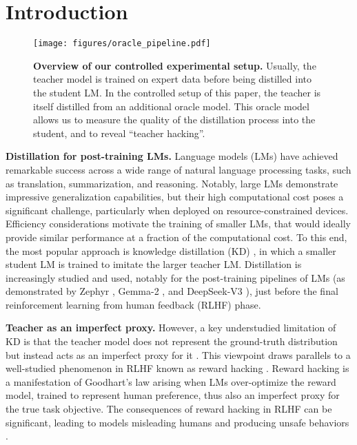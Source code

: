 \section{Introduction}\label{sec:intro}

\begin{figure}
    \centering
    \texttt{[image: figures/oracle\_pipeline.pdf]}
    \caption{\textbf{Overview of our controlled experimental setup.} Usually, the teacher model is trained on expert data before being distilled into the student LM. In the controlled setup of this paper, the teacher is  itself distilled from an additional oracle model. This oracle model allows us to measure the quality of the distillation process into the student, and to reveal \enquote{teacher hacking}.}
    \label{fig:oracle_pipeline}
\end{figure}



\textbf{Distillation for post-training LMs.}
Language models (LMs) have achieved remarkable success across a wide range of natural language processing tasks, such as translation, summarization, and reasoning.
Notably, large LMs demonstrate impressive generalization capabilities, but their high computational cost poses a significant challenge, particularly when deployed on resource-constrained devices. Efficiency considerations motivate the training of smaller LMs, that would ideally provide similar performance at a fraction of the computational cost. To this end, the most popular approach is knowledge distillation (KD) \cite{hinton2015distilling}, in which a smaller student LM is trained to imitate the larger teacher LM.
Distillation is increasingly studied \cite{agarwal2024onpolicy,gu2024minillm,kim2024promptkd} and used, notably for the post-training pipelines of LMs (as demonstrated by Zephyr \cite{tunstall2023zephyr}, Gemma-2 \cite{team2024gemma}, and DeepSeek-V3 \cite{liu2024deepseek}), just before the final reinforcement learning from human feedback (RLHF) \cite{stiennon2020learning,ouyang2022training,bai2022training} phase.

\textbf{Teacher as an imperfect proxy.}
However, a key understudied limitation of KD is that the teacher model does not represent the ground-truth distribution but instead acts as an imperfect proxy for it \citep{menon2021statistical,zhang2023not}. This viewpoint draws parallels to a well-studied phenomenon in RLHF known as reward hacking \cite{amodei2016concrete,pan2022effects,gao2023scaling}. Reward hacking is a manifestation of Goodhart's law arising when LMs over-optimize the reward model, trained to represent human preference, thus also an imperfect proxy for the true task objective. The consequences of reward hacking in RLHF can be significant, leading to models misleading humans and producing unsafe behaviors \cite{hendrycks2021unsolved,wen2024language}. 



